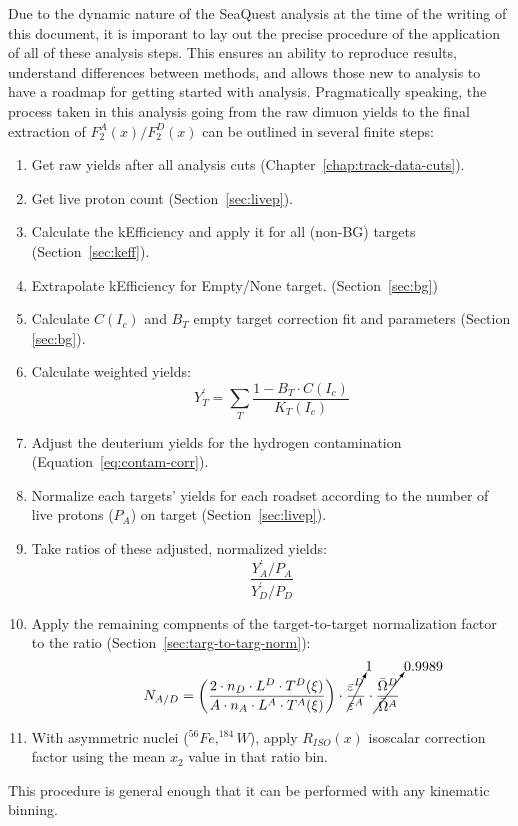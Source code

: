 Due to the dynamic nature of the SeaQuest analysis at the time of the writing of this document, it is imporant to lay out the precise procedure of the application of all of these analysis steps. This ensures an ability to reproduce results, understand differences between methods, and allows those new to analysis to have a roadmap for getting started with analysis. Pragmatically speaking, the process taken in this analysis going from the raw dimuon yields to the final extraction of $F_2^A(x)/F_2^D(x)$ can be outlined in several finite steps:
\begin{enumerate}
	\item Get raw yields after all analysis cuts (Chapter~\ref{chap:track-data-cuts}).
	\item Get live proton count (Section~\ref{sec:livep}).
	\item Calculate the kEfficiency and apply it for all (non-BG) targets (Section~\ref{sec:keff}).
	\item Extrapolate kEfficiency for Empty/None target. (Section~\ref{sec:bg})
	\item Calculate $C(I_c)$ and $B_T$ empty target correction fit and parameters (Section \ref{sec:bg}).
	\item Calculate weighted yields:
	\begin{equation}
	Y_T^\prime = \sum\limits_T \frac{1 - B_T \cdot C(I_c)}{K_T(I_c)}
	\end{equation}
	\item Adjust the deuterium yields for the hydrogen contamination (Equation~\ref{eq:contam-corr}).
	\item Normalize each targets' yields for each roadset according to the number of live protons ($P_A$) on target (Section~\ref{sec:livep}).
	\item Take ratios of these adjusted, normalized yields:
	\begin{equation}
		\frac{Y_A^\prime / P_A}{Y_D^\prime / P_D}
	\end{equation}
	\item Apply the remaining compnents of the target-to-target normalization factor to the ratio (Section~\ref{sec:targ-to-targ-norm}):
	\begin{equation}
	N_{A/D} =
	\left( \frac{ 2 \cdot n_D \cdot L^D \cdot T^D(\xi)}{ A \cdot n_A \cdot L^A \cdot T^A(\xi)} \right) \cdot 
	\cancelto{1}{\frac{ \varepsilon^D }{ \varepsilon^A }}  \cdot 
	\cancelto{0.9989}{\frac{ \bar{\Omega}^D }{\bar{ \Omega}^A }}
	\end{equation}
	\item With asymmetric nuclei ($^{56}Fe, ^{184}W$), apply $R_{ISO}(x)$ isoscalar correction factor using the mean $x_2$ value in that ratio bin.
\end{enumerate}
This procedure is general enough that it can be performed with any kinematic binning.

